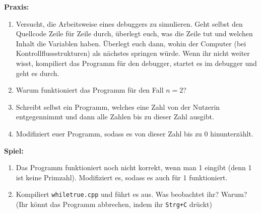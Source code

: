 \textbf{Praxis:}
\begin{enumerate}
    \item Versucht, die Arbeitsweise eines debuggers zu simulieren. Geht selbst
        den Quellcode Zeile für Zeile durch, überlegt euch, was die Zeile tut
        und welchen Inhalt die Variablen haben. Überlegt euch dann, wohin der
        Computer (bei Kontrollflussstrukturen) als nächstes springen würde.
        Wenn ihr nicht weiter wisst, kompiliert das Programm für den debugger,
        startet es im debugger und geht es durch.
    \item Warum funktioniert das Programm für den Fall $n = 2$?
    \item Schreibt selbst ein Programm, welches eine Zahl von der Nutzerin
        entgegennimmt und dann alle Zahlen bis zu dieser Zahl ausgibt.
    \item Modifiziert euer Programm, sodass es von dieser Zahl bis zu 0
        hinunterzählt.
\end{enumerate}

\textbf{Spiel:}
\begin{enumerate}
    \item Das Programm funktioniert noch nicht korrekt, wenn man 1 eingibt
        (denn 1 ist keine Primzahl). Modifiziert es, sodass es auch für 1
        funktioniert.
    \item Kompiliert \texttt{whiletrue.cpp} und führt es aus. Was beobachtet
        ihr? Warum? (Ihr könnt das Programm abbrechen, indem ihr
        \texttt{Strg+C} drückt)
\end{enumerate}

